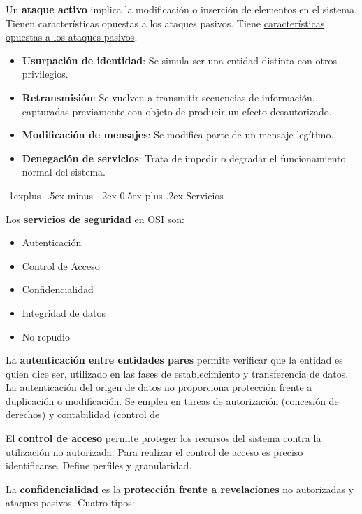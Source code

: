 \documentclass[10pt,portrait, twocolumn]{article}
\makeatletter
\renewcommand{\subsection}{\@startsection{subsection}{2}{0mm}%
                                {-1explus -.5ex minus -.2ex}%
                                {0.5ex plus .2ex}%
                                {\normalfont\normalsize\bfseries}}
\makeatother
\begin{document}
	Un \textbf{ataque activo} implica la modificación o inserción de elementos en el sistema. Tienen características opuestas a los ataques pasivos. Tiene \underline{características opuestas a los ataques pasivos}.
	
		\begin{itemize}
			\item \textbf{Usurpación de identidad}: Se simula ser una entidad distinta con otros privilegios.
			\item \textbf{Retransmisión}: Se vuelven a transmitir secuencias de información, capturadas previamente con objeto de producir un efecto desautorizado.
			\item \textbf{Modificación de mensajes}: Se modifica parte de un mensaje legítimo.
			\item \textbf{Denegación de servicios}: Trata de impedir o degradar el funcionamiento normal del sistema.
		\end{itemize}
	
	\subsection{Servicios}
	
Los \textbf{servicios de seguridad} en OSI son:

	\begin{itemize}
		\item Autenticación
		\item Control de Acceso
		\item Confidencialidad
		\item Integridad de datos
		\item No repudio
	\end{itemize}
	
La \textbf{autenticación entre entidades pares} permite verificar que la entidad es quien dice ser, utilizado en las fases de establecimiento y transferencia de datos. La autenticación del origen de datos no proporciona protección frente a duplicación o modificación. Se emplea en tareas de autorización (concesión de derechos) y contabilidad (control de 

\quad El \textbf{control de acceso} permite proteger los recursos del sistema contra la utilización no autorizada. Para realizar el control de acceso es preciso identificarse. Define perfiles y granularidad.
	
\quad La \textbf{confidencialidad} es la \textbf{protección frente a revelaciones} no autorizadas y ataques pasivos. Cuatro tipos:
	
\end{document}
